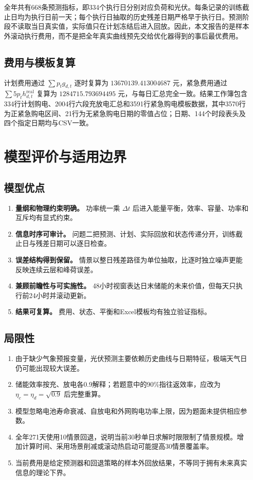 \documentclass[UTF8,12pt,a4paper]{ctexart}
\begin{document}
全年共有668条预测指标，即334个执行日分别对应负荷和光伏。每条记录的训练截止日均为执行日前一天；每个执行日抽取的历史残差日期严格早于执行日。预测阶段不读取当日真实值，实际值只在计划冻结后进入回放。因此，本文报告的是样本外滚动执行费用，而不是把全年真实曲线预先交给优化器得到的事后最优费用。

\subsection{费用与模板复算}

计划费用通过 $\sum p_tg_{d,t}$ 逐时复算为 $13670139.413004687$ 元，紧急费用通过 $\sum5p_th_{d,t}^{\mathrm{real}}$ 复算为 $1284715.793694495$ 元，与每日汇总完全一致。结果工作簿包含334行计划购电、2004行六段充放电汇总和3591行紧急购电模板数据，其中3570行为正紧急购电区间、21行为无紧急购电日期的零值占位；日期、144个时段表头及四个指定日期均与CSV一致。

\section{模型评价与适用边界}

\subsection{模型优点}

\begin{enumerate}
  \item \textbf{量纲和物理约束明确。} 功率统一乘 $\Delta t$ 后进入能量平衡，效率、容量、功率和互斥均有显式约束。
  \item \textbf{信息时序可审计。} 问题二把预测、计划、实际回放和状态传递分开，训练截止日与残差日期可以逐日检查。
  \item \textbf{误差结构得到保留。} 情景以整日残差路径为单位抽取，比逐时独立噪声更能反映连续云层和峰荷误差。
  \item \textbf{兼顾前瞻性与可实施性。} 48小时视窗表达日末储能的未来价值，但每天只执行前24小时并滚动更新。
  \item \textbf{结果可复算。} 费用、状态、平衡和Excel模板均有独立验证指标。
\end{enumerate}

\subsection{局限性}

\begin{enumerate}
  \item 由于缺少气象预报变量，光伏预测主要依赖历史曲线与日期特征，极端天气日仍可能出现较大误差。
  \item 储能效率按充、放电各0.9解释；若题意中的90\%指往返效率，应改为 $\eta_c=\eta_d=\sqrt{0.9}$ 后完整重算。
  \item 模型忽略电池寿命衰减、自放电和外网购电功率上限，因为题面未提供相应参数。
  \item 全年271天使用10情景回退，说明当前30秒单日求解时限限制了情景规模。增加计算时间、采用场景削减或滚动热启动可能提高30情景覆盖率。
  \item 当前费用是给定预测器和回退策略的样本外回放结果，不等同于拥有未来真实信息的理论下界。
\end{enumerate}
\end{document}
